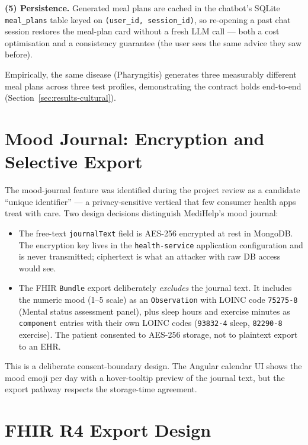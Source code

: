 \documentclass[12pt]{caltech_thesis}
\begin{document}
\textbf{(5) Persistence.} Generated meal plans are cached in the chatbot's
SQLite \texttt{meal\_plans} table keyed on \texttt{(user\_id,
session\_id)}, so re-opening a past chat session restores the meal-plan
card without a fresh LLM call --- both a cost optimisation and a
consistency guarantee (the user sees the same advice they saw before).

Empirically, the same disease (Pharyngitis) generates three measurably
different meal plans across three test profiles, demonstrating the
contract holds end-to-end (Section~\ref{sec:results-cultural}).

\section{Mood Journal: Encryption and Selective Export}
\label{sec:mood}

The mood-journal feature was identified during the project review as a
candidate ``unique identifier'' --- a privacy-sensitive vertical that few
consumer health apps treat with care. Two design decisions distinguish
MediHelp's mood journal:
\begin{itemize}
    \item The free-text \texttt{journalText} field is AES-256 encrypted at
    rest in MongoDB. The encryption key lives in the
    \texttt{health-service} application configuration and is never
    transmitted; ciphertext is what an attacker with raw DB access would
    see.
    \item The FHIR \texttt{Bundle} export deliberately \textit{excludes}
    the journal text. It includes the numeric mood (1--5 scale) as an
    \texttt{Observation} with LOINC code \texttt{75275-8} (Mental status
    assessment panel), plus sleep hours and exercise minutes as
    \texttt{component} entries with their own LOINC codes
    (\texttt{93832-4} sleep, \texttt{82290-8} exercise). The patient
    consented to AES-256 storage, not to plaintext export to an EHR.
\end{itemize}

This is a deliberate consent-boundary design. The Angular calendar UI
shows the mood emoji per day with a hover-tooltip preview of the journal
text, but the export pathway respects the storage-time agreement.

\section{FHIR R4 Export Design}
\label{sec:fhir}
\end{document}

